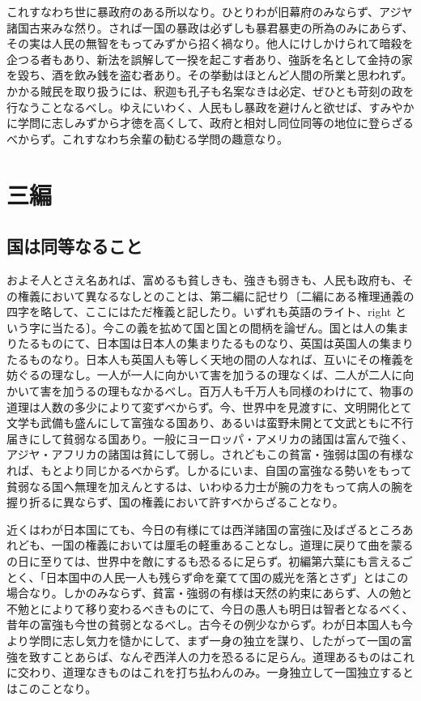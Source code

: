 \documentclass[a4paper, platex, dvipdfmx]{jsarticle}
\begin{document}
これすなわち世に暴政府のある所以なり。ひとりわが旧幕府のみならず、アジヤ諸国古来みな然り。されば一国の暴政は必ずしも暴君暴吏の所為のみにあらず、その実は人民の無智をもってみずから招く禍なり。他人にけしかけられて暗殺を企つる者もあり、新法を誤解して一揆を起こす者あり、強訴を名として金持の家を毀ち、酒を飲み銭を盗む者あり。その挙動はほとんど人間の所業と思われず。かかる賊民を取り扱うには、釈迦も孔子も名案なきは必定、ぜひとも苛刻の政を行なうことなるべし。ゆえにいわく、人民もし暴政を避けんと欲せば、すみやかに学問に志しみずから才徳を高くして、政府と相対し同位同等の地位に登らざるべからず。これすなわち余輩の勧むる学問の趣意なり。

\section{三編}
\subsection{国は同等なること}
およそ人とさえ名あれば、富めるも貧しきも、強きも弱きも、人民も政府も、その権義において異なるなしとのことは、第二編に記せり〔二編にある権理通義の四字を略して、ここにはただ権義と記したり。いずれも英語のライト、right という字に当たる〕。今この義を拡めて国と国との間柄を論ぜん。国とは人の集まりたるものにて、日本国は日本人の集まりたるものなり、英国は英国人の集まりたるものなり。日本人も英国人も等しく天地の間の人なれば、互いにその権義を妨ぐるの理なし。一人が一人に向かいて害を加うるの理なくば、二人が二人に向かいて害を加うるの理もなかるべし。百万人も千万人も同様のわけにて、物事の道理は人数の多少によりて変ずべからず。今、世界中を見渡すに、文明開化とて文学も武備も盛んにして富強なる国あり、あるいは蛮野未開とて文武ともに不行届きにして貧弱なる国あり。一般にヨーロッパ・アメリカの諸国は富んで強く、アジヤ・アフリカの諸国は貧にして弱し。されどもこの貧富・強弱は国の有様なれば、もとより同じかるべからず。しかるにいま、自国の富強なる勢いをもって貧弱なる国へ無理を加えんとするは、いわゆる力士が腕の力をもって病人の腕を握り折るに異ならず、国の権義において許すべからざることなり。

近くはわが日本国にても、今日の有様にては西洋諸国の富強に及ばざるところあれども、一国の権義においては厘毛の軽重あることなし。道理に戻りて曲を蒙るの日に至りては、世界中を敵にするも恐るるに足らず。初編第六葉にも言えるごとく、「日本国中の人民一人も残らず命を棄てて国の威光を落とさず」とはこの場合なり。しかのみならず、貧富・強弱の有様は天然の約束にあらず、人の勉と不勉とによりて移り変わるべきものにて、今日の愚人も明日は智者となるべく、昔年の富強も今世の貧弱となるべし。古今その例少なからず。わが日本国人も今より学問に志し気力を慥かにして、まず一身の独立を謀り、したがって一国の富強を致すことあらば、なんぞ西洋人の力を恐るるに足らん。道理あるものはこれに交わり、道理なきものはこれを打ち払わんのみ。一身独立して一国独立するとはこのことなり。
\end{document}
